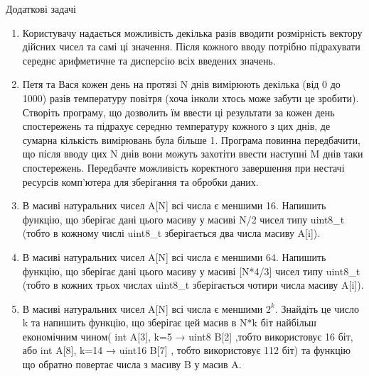\documentclass[]{article}
\begin{document}
Додаткові задачі

\begin{enumerate}
\def\labelenumi{\arabic{enumi})}
\setcounter{enumi}{7}
\item
  Користувачу надається можливість декілька разів вводити розмірність
  вектору дійсних чисел та самі ці значення. Після кожного вводу
  потрібно підрахувати середнє арифметичне та дисперсію всіх введених
  значень.
\item
  Петя та Вася кожен день на протязі N днів вимірюють
  декілька (від 0 до 1000) разів температуру повітря (хоча інколи хтось
  може забути це зробити). Створіть програму, що дозволить їм ввести ці
  результати за кожен день спостережень та підрахує середню температуру
  кожного з цих днів, де сумарна кількість вимірювань була більше 1.
  Програма повинна передбачити, що після вводу цих N днів вони можуть
  захотіти ввести наступні M днів таки спостережень. Передбачте
  можливість коректного завершення при нестачі ресурсів комп'ютера для
  зберігання та обробки даних.
\item
 В масиві натуральних чисел A{[}N{]} всі числа є меншими 16. Напишить
  функцію, що зберігає дані цього масиву у масиві N/2 чисел типу
  uint8\_t (тобто в кожному числі uint8\_t зберігається два числа масиву
  A{[}i{]}).
\item
  В масиві натуральних чисел A{[}N{]} всі числа є меншими 64. Напишить
  функцію, що зберігає дані цього масиву у масиві {[}N*4/3{]} чисел типу
  uint8\_t (тобто в кожних трьох числах uint8\_t зберігається чотири
  числа масиву A{[}i{]}).
\item
  В масиві натуральних чисел A{[}N{]} всі числа є меншими \(2^{k}\).
  Знайдіть це число k та напишить функцію, що зберігає цей масив в N*k
  біт найбільш економічним чином( int A{[}3{]}, k=5 → uint8 B{[}2{]}
  ,тобто використовує 16 біт, або int A{[}8{]}, k=14 → uint16 B{[}7{]} ,
  тобто використовує 112 біт) та функцію що обратно повертає числа з
  масиву B у масив A.
\end{enumerate}
\end{document}
